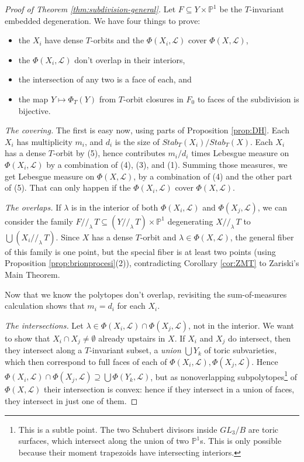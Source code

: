 \documentclass[11pt]{amsart}
\theoremstyle{definition}
\newcommand{\PP}{\mathbb{P}}
\newcommand\Union\bigcup
\newcommand\calL{{\mathcal L}}
\begin{document}
\begin{proof}[Proof of Theorem \ref{thm:subdivision-general}]
  Let $F \subseteq Y \times \PP^1$ be the $T$-invariant embedded degeneration.
  We have four things to prove:
  \begin{itemize}
  \item the $X_i$ have dense $T$-orbits and the $\Phi(X_i,\calL)$
    cover $\Phi(X,\calL)$,
  \item the $\Phi(X_i,\calL)$ don't overlap in their interiors, 
  \item the intersection of any two is a face of each, and
  \item the map $Y \mapsto \Phi_T(Y)$ from $T$-orbit closures in $F_0$
    to faces of the subdivision is bijective.
  \end{itemize}

  {\em The covering.}
  The first is easy now, using parts of Proposition \ref{prop:DH}. Each $X_i$ has multiplicity $m_i$, and $d_i$ is the size of  $Stab_T(X_i)/Stab_T(X)$. 
  Each $X_i$ has a dense $T$-orbit by (5), hence contributes $m_i/d_i$ times
  Lebesgue measure on $\Phi(X_i, \calL)$ by a combination of (4), (3), and (1).
  Summing those measures, we get Lebesgue measure on $\Phi(X,\calL)$,
  by a combination of (4) and the other part of (5). That can only happen
  if the $\Phi(X_i,\calL)$ cover $\Phi(X,\calL)$.

  {\em The overlaps.}
  If $\lambda$ is in the interior of both $\Phi(X_i,\calL)$ and $\Phi(X_j,\calL)$,
  we can consider the family
  $F//_\lambda\, T \subseteq (Y//_\lambda\, T) \times \PP^1$ degenerating
  $X//_\lambda\, T$ to $\Union (X_i //_\lambda\, T)$. Since $X$ has a dense
  $T$-orbit and $\lambda \in \Phi(X,\calL)$, the general fiber of this family
  is one point, but the special fiber is at least two points
  (using Proposition \ref{prop:brionprocesi}(2)),
  contradicting Corollary \ref{cor:ZMT} to Zariski's Main Theorem.

  Now that we know the polytopes don't overlap, revisiting the
  sum-of-measures calculation shows that $m_i = d_i$ for each $X_i$.

  {\em The intersections.}
  Let $\lambda \in \Phi(X_i,\calL) \cap \Phi(X_j,\calL)$, not in
  the interior. We want to show that $X_i\cap X_j \neq \emptyset$
  already upstairs in $X$. If $X_i$ and $X_j$ do intersect, then they intersect
  along a $T$-invariant subset, a {\em union} $\Union Y_k$
  of toric subvarieties, which then correspond to full faces of each of
  $\Phi(X_i,\calL), \Phi(X_j,\calL)$.
  Hence $\Phi(X_i,\calL) \cap \Phi(X_j,\calL) \supseteq \Union \Phi(Y_k,\calL)$,
  but as nonoverlapping subpolytopes\footnote{This is a subtle point.
    The two Schubert divisors inside $GL_3/B$ are toric surfaces,
    which intersect along the union of two $\PP^1$s. This is only
    possible because their moment trapezoids have intersecting interiors.}
  of $\Phi(X,\calL)$ their intersection is convex: hence if they
  intersect in a union of faces, they intersect in just one of them.


\end{proof}
\end{document}
